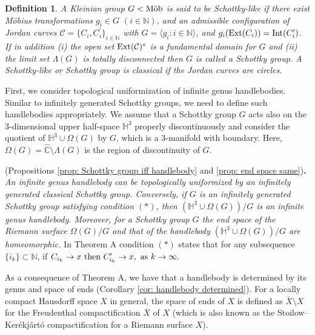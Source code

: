 \documentclass[12pt]{amsart}
\theoremstyle{plain}
\newtheorem{definition}[thm]{Definition}
\DeclareMathOperator{\Mob}{\mbox{\rm{M\"ob}}}
\DeclareMathOperator{\Int}{\rm Int}
\DeclareMathOperator{\Ext}{\rm Ext}
\begin{document}
\begin{definition}\label{Schottky}
{\rm  
A Kleinian group $G < \Mob$ is said to be {\it Schottky-like}  
if there exist M\"obius transformations $g_i \in G$
$(i \in \mathbb N)$,
and an admissible configuration of Jordan curves 
$\mathcal{C}=\{C_i ,C_i ^{\prime}\}_{i \in \mathbb N}$ with
$G =\langle g_i :i \in \mathbb N\rangle$, and 
$g_i(\Ext(C_i))=\Int( C_i^{\prime})$. If in addition
(i) the open set $\Ext (\mathcal{C})^{\circ}$  is a fundamental domain for $G$ and (ii) the limit set $\Lambda (G)$ is totally disconnected then  $G$ is called a {\it Schottky}  group.
A Schottky-like or Schottky group is {\it classical} if the Jordan curves are circles. }
\end{definition}  


First, we consider topological uniformization of infinite genus handlebodies. Similar to infinitely generated Schottky groups,
we need to define such handlebodies appropriately. We assume that a Schottky group $G$ acts also on
the $3$-dimensional upper half-space $\mathbb H^3$ properly discontinuously and consider the quotient of
$\mathbb H^3 \cup \Omega(G)$ by $G$, which is a $3$-manifold with boundary. Here, 
$\Omega(G)=\widehat{\mathbb C} \setminus \Lambda(G)$ is the region of discontinuity of $G$.

\vskip10pt
 (Propositions \ref{prop: Schottky group iff handlebody} and \ref{prop: end space same}){\bf .}
{\it  An infinite genus handlebody can be topologically uniformized by an infinitely generated classical Schottky group. 
Conversely,  if  $G$ is an infinitely generated Schottky group 
satisfying condition $(\ast)$, then  $(\mathbb{H}^{3} \cup \Omega(G))/G$ is an infinite genus handlebody. Moreover, for a Schottky group  $G$
 the end space of the Riemann surface $\Omega(G)/G$ and that of the handlebody $(\mathbb H^3 \cup \Omega(G))/G$ are homeomorphic. }
\vskip10pt 
In Theorem A condition $(\ast)$  states that 
for any  subsequence $\{i_k\} \subset \mathbb N$,  if 
$C_{i_k}  \rightarrow x \ \mbox{\rm then }  C_{i_k}^{\prime}  \rightarrow x, \ {\rm as}\ k \to \infty.$

As a consequence of Theorem A, we have 
that  a handlebody is determined by its genus and space of ends (Corollary \ref{cor: handlebody determined}).
For a locally compact Hausdorff space $X$ in general, the space of ends of $X$ is defined as $\overline X \setminus X$ for
the Freudenthal compactification $\overline X$ of $X$ (which is also known as the Stoilow--Ker\'ekj\'art\'o compactification
for a Riemann surface $X$).
\end{document}
